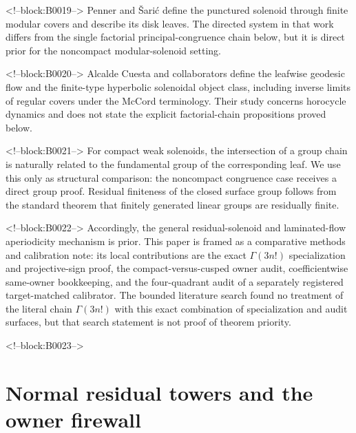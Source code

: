 \documentclass[11pt]{article}
\theoremstyle{definition}
\theoremstyle{remark}
\begin{document}
<!--block:B0019-->
Penner and Šarić define the punctured solenoid through finite modular covers and describe its disk leaves.
\citep[Introduction and Definition~2.1]{penner2008}
The directed system in that work differs from the single factorial principal-congruence chain below, but it is direct prior for the noncompact modular-solenoid setting.

<!--block:B0020-->
Alcalde Cuesta and collaborators define the leafwise geodesic flow and the finite-type hyperbolic solenoidal object class, including inverse limits of regular covers under the McCord terminology.
\citep[Definitions~4, 5, and 7]{alcalde2026}
Their study concerns horocycle dynamics and does not state the explicit factorial-chain propositions proved below.

<!--block:B0021-->
For compact weak solenoids, the intersection of a group chain is naturally related to the fundamental group of the corresponding leaf.
\citep[Definition~5.5]{hurder2019}
We use this only as structural comparison: the noncompact congruence case receives a direct group proof. Residual finiteness of the closed surface group follows from the standard theorem that finitely generated linear groups are residually finite.
\citep[p.~1]{nica2013}

<!--block:B0022-->
Accordingly, the general residual-solenoid and laminated-flow aperiodicity mechanism is prior. This paper is framed as a comparative methods and calibration note: its local contributions are the exact $\Gamma(3n!)$ specialization and projective-sign proof, the compact-versus-cusped owner audit, coefficientwise same-owner bookkeeping, and the four-quadrant audit of a separately registered target-matched calibrator. The bounded literature search found no treatment of the literal chain $\Gamma(3n!)$ with this exact combination of specialization and audit surfaces, but that search statement is not proof of theorem priority.

<!--block:B0023-->
\section{Normal residual towers and the owner firewall}
\end{document}
